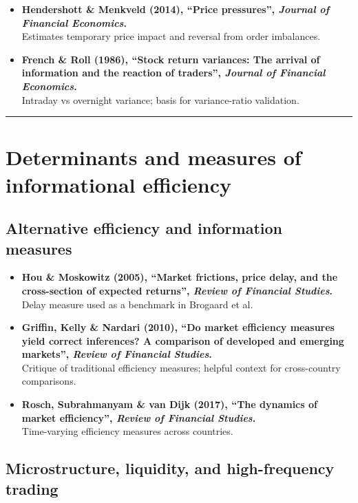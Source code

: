 \documentclass[11pt,a4paper]{article}
\begin{document}
\begin{itemize}
  \item \textbf{Hendershott \& Menkveld (2014), ``Price pressures'', \emph{Journal of Financial Economics}.}\\
  Estimates temporary price impact and reversal from order imbalances.

  \item \textbf{French \& Roll (1986), ``Stock return variances: The arrival of information and the reaction of traders'', \emph{Journal of Financial Economics}.}\\
  Intraday vs overnight variance; basis for variance-ratio validation.
\end{itemize}

\bigskip
\hrule
\bigskip

\section{Determinants and measures of informational efficiency}

\subsection{Alternative efficiency and information measures}

\begin{itemize}
  \item \textbf{Hou \& Moskowitz (2005), ``Market frictions, price delay, and the cross-section of expected returns'', \emph{Review of Financial Studies}.}\\
  Delay measure used as a benchmark in Brogaard et al.

  \item \textbf{Griffin, Kelly \& Nardari (2010), ``Do market efficiency measures yield correct inferences? A comparison of developed and emerging markets'', \emph{Review of Financial Studies}.}\\
  Critique of traditional efficiency measures; helpful context for cross-country comparisons.

  \item \textbf{Rosch, Subrahmanyam \& van Dijk (2017), ``The dynamics of market efficiency'', \emph{Review of Financial Studies}.}\\
  Time-varying efficiency measures across countries.
\end{itemize}

\subsection{Microstructure, liquidity, and high-frequency trading}
\end{document}

